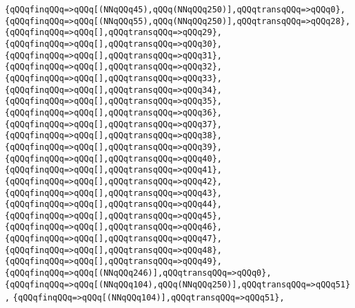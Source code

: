 \verb|{qQQqfinqQQq=>qQQq[(NNqQQq45),qQQq(NNqQQq250)],qQQqtransqQQq=>qQQq0},|\newline
\verb|{qQQqfinqQQq=>qQQq[(NNqQQq55),qQQq(NNqQQq250)],qQQqtransqQQq=>qQQq28},|\newline
\verb|{qQQqfinqQQq=>qQQq[],qQQqtransqQQq=>qQQq29},|\newline
\verb|{qQQqfinqQQq=>qQQq[],qQQqtransqQQq=>qQQq30},|\newline
\verb|{qQQqfinqQQq=>qQQq[],qQQqtransqQQq=>qQQq31},|\newline
\verb|{qQQqfinqQQq=>qQQq[],qQQqtransqQQq=>qQQq32},|\newline
\verb|{qQQqfinqQQq=>qQQq[],qQQqtransqQQq=>qQQq33},|\newline
\verb|{qQQqfinqQQq=>qQQq[],qQQqtransqQQq=>qQQq34},|\newline
\verb|{qQQqfinqQQq=>qQQq[],qQQqtransqQQq=>qQQq35},|\newline
\verb|{qQQqfinqQQq=>qQQq[],qQQqtransqQQq=>qQQq36},|\newline
\verb|{qQQqfinqQQq=>qQQq[],qQQqtransqQQq=>qQQq37},|\newline
\verb|{qQQqfinqQQq=>qQQq[],qQQqtransqQQq=>qQQq38},|\newline
\verb|{qQQqfinqQQq=>qQQq[],qQQqtransqQQq=>qQQq39},|\newline
\verb|{qQQqfinqQQq=>qQQq[],qQQqtransqQQq=>qQQq40},|\newline
\verb|{qQQqfinqQQq=>qQQq[],qQQqtransqQQq=>qQQq41},|\newline
\verb|{qQQqfinqQQq=>qQQq[],qQQqtransqQQq=>qQQq42},|\newline
\verb|{qQQqfinqQQq=>qQQq[],qQQqtransqQQq=>qQQq43},|\newline
\verb|{qQQqfinqQQq=>qQQq[],qQQqtransqQQq=>qQQq44},|\newline
\verb|{qQQqfinqQQq=>qQQq[],qQQqtransqQQq=>qQQq45},|\newline
\verb|{qQQqfinqQQq=>qQQq[],qQQqtransqQQq=>qQQq46},|\newline
\verb|{qQQqfinqQQq=>qQQq[],qQQqtransqQQq=>qQQq47},|\newline
\verb|{qQQqfinqQQq=>qQQq[],qQQqtransqQQq=>qQQq48},|\newline
\verb|{qQQqfinqQQq=>qQQq[],qQQqtransqQQq=>qQQq49},|\newline
\verb|{qQQqfinqQQq=>qQQq[(NNqQQq246)],qQQqtransqQQq=>qQQq0},|\newline
\verb|{qQQqfinqQQq=>qQQq[(NNqQQq104),qQQq(NNqQQq250)],qQQqtransqQQq=>qQQq51},|\newline
\verb|{qQQqfinqQQq=>qQQq[(NNqQQq104)],qQQqtransqQQq=>qQQq51},|\newline

